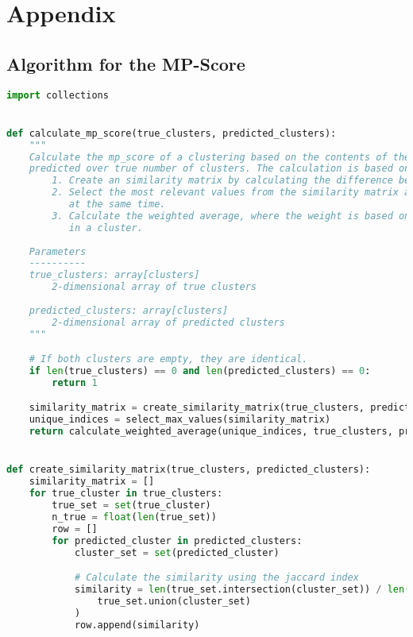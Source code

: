 \section{Appendix}
\label{sec:8_appendix}

\subsection{Algorithm for the MP-Score}
\label{subsec:8_algorithm_for_the_mp_score}

\begin{lstlisting}[language=Python, caption=Calculate the MP-Score between two clusterings., label={lst:select_max_values}]
import collections


def calculate_mp_score(true_clusters, predicted_clusters):
    """
    Calculate the mp_score of a clustering based on the contents of the clusters and the overall difference in
    predicted over true number of clusters. The calculation is based on three steps:
        1. Create an similarity matrix by calculating the difference between each cluster of both clusterings.
        2. Select the most relevant values from the similarity matrix and make sure no two clusters are being used 
           at the same time.
        3. Calculate the weighted average, where the weight is based on the true and predicted amount of elements 
           in a cluster.
    
    Parameters
    ----------
    true_clusters: array[clusters]
        2-dimensional array of true clusters
    
    predicted_clusters: array[clusters] 
        2-dimensional array of predicted clusters
    """

    # If both clusters are empty, they are identical.
    if len(true_clusters) == 0 and len(predicted_clusters) == 0:
        return 1

    similarity_matrix = create_similarity_matrix(true_clusters, predicted_clusters)
    unique_indices = select_max_values(similarity_matrix)
    return calculate_weighted_average(unique_indices, true_clusters, predicted_clusters)


def create_similarity_matrix(true_clusters, predicted_clusters):
    similarity_matrix = []
    for true_cluster in true_clusters:
        true_set = set(true_cluster)
        n_true = float(len(true_set))
        row = []
        for predicted_cluster in predicted_clusters:
            cluster_set = set(predicted_cluster)

            # Calculate the similarity using the jaccard index
            similarity = len(true_set.intersection(cluster_set)) / len(
                true_set.union(cluster_set)
            )
            row.append(similarity)


\end{lstlisting}
